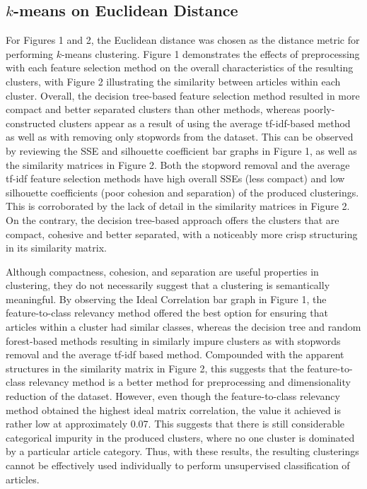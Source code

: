 \documentclass[11pt]{article}
\begin{document}
\subsection{$k$-means on Euclidean Distance} \label{sec:euclid}

For Figures 1 and 2, the Euclidean distance was chosen as the distance metric for performing $k$-means clustering.
Figure 1 demonstrates the effects of preprocessing with each feature selection method on the overall characteristics of the resulting clusters, with Figure 2 illustrating the similarity between articles within each cluster.
Overall, the decision tree-based feature selection method resulted in more compact and better separated clusters than other methods, whereas poorly-constructed clusters appear as a result of using the average tf-idf-based method as well as with removing only stopwords from the dataset.
This can be observed by reviewing the SSE and silhouette coefficient bar graphs in Figure 1, as well as the similarity matrices in Figure 2.
Both the stopword removal and the average tf-idf feature selection methods have high overall SSEs (less compact) and low silhouette coefficients (poor cohesion and separation) of the produced clusterings.
This is corroborated by the lack of detail in the similarity matrices in Figure 2.
On the contrary, the decision tree-based approach offers the clusters that are compact, cohesive and better separated, with a noticeably more crisp structuring in its similarity matrix.

Although compactness, cohesion, and separation are useful properties in clustering, they do not necessarily suggest that a clustering is semantically meaningful.
By observing the Ideal Correlation bar graph in Figure 1, the feature-to-class relevancy method offered the best option for ensuring that articles within a cluster had similar classes, whereas the decision tree and random forest-based methods resulting in similarly impure clusters as with stopwords removal and the average tf-idf based method.
Compounded with the apparent structures in the similarity matrix in Figure 2, this suggests that the feature-to-class relevancy method is a better method for preprocessing and dimensionality reduction of the dataset.
However, even though the feature-to-class relevancy method obtained the highest ideal matrix correlation, the value it achieved is rather low at approximately 0.07.
This suggests that there is still considerable categorical impurity in the produced clusters, where no one cluster is dominated by a particular article category.
Thus, with these results, the resulting clusterings cannot be effectively used individually to perform unsupervised classification of articles.
\end{document}

